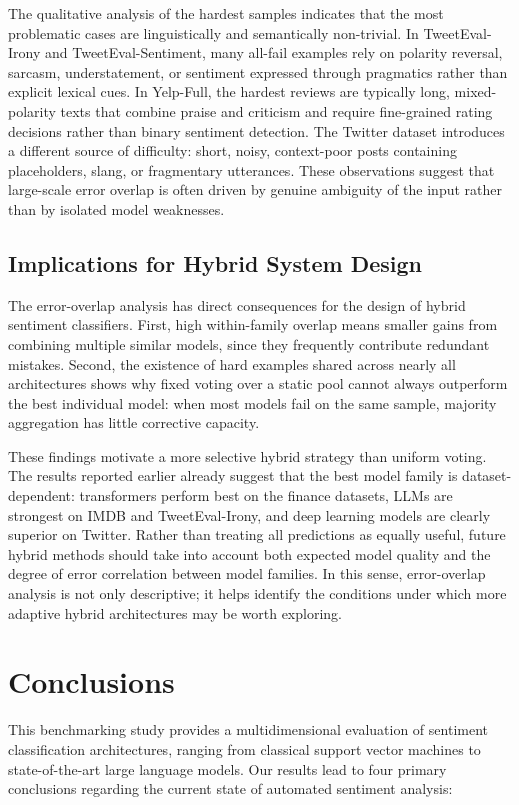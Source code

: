 \documentclass[conference]{IEEEtran}
\begin{document}
The qualitative analysis of the hardest samples indicates that the most problematic cases are linguistically and semantically non-trivial. In TweetEval-Irony and TweetEval-Sentiment, many all-fail examples rely on polarity reversal, sarcasm, understatement, or sentiment expressed through pragmatics rather than explicit lexical cues. In Yelp-Full, the hardest reviews are typically long, mixed-polarity texts that combine praise and criticism and require fine-grained rating decisions rather than binary sentiment detection. The Twitter dataset introduces a different source of difficulty: short, noisy, context-poor posts containing placeholders, slang, or fragmentary utterances. These observations suggest that large-scale error overlap is often driven by genuine ambiguity of the input rather than by isolated model weaknesses.

\subsection{Implications for Hybrid System Design}

The error-overlap analysis has direct consequences for the design of hybrid sentiment classifiers. First, high within-family overlap means smaller gains from combining multiple similar models, since they frequently contribute redundant mistakes. Second, the existence of hard examples shared across nearly all architectures shows why fixed voting over a static pool cannot always outperform the best individual model: when most models fail on the same sample, majority aggregation has little corrective capacity.

These findings motivate a more selective hybrid strategy than uniform voting. The results reported earlier already suggest that the best model family is dataset-dependent: transformers perform best on the finance datasets, LLMs are strongest on IMDB and TweetEval-Irony, and deep learning models are clearly superior on Twitter. Rather than treating all predictions as equally useful, future hybrid methods should take into account both expected model quality and the degree of error correlation between model families. In this sense, error-overlap analysis is not only descriptive; it helps identify the conditions under which more adaptive hybrid architectures may be worth exploring.

\section{Conclusions}
This benchmarking study provides a multidimensional evaluation of sentiment classification architectures, ranging from classical support vector machines to state-of-the-art large language models. Our results lead to four primary conclusions regarding the current state of automated sentiment analysis:
\end{document}
